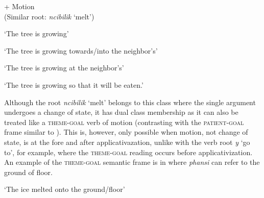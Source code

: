 \documentclass[output=paper]{langsci/langscibook}
\begin{document}
\ea\label{ex:sibanda:13}
\settowidth{}
 {+ Motion}\\
 (Similar root: \textit{ncibilik} ‘melt’)\\

\glt ‘The tree is growing’


\glt ‘The tree is growing towards/into the neighbor’s’


\glt ‘The tree is growing at the neighbor’s’ 


\glt ‘The tree is growing so that it will be eaten.’ 
\z
\z

Although the root \textit{ncibilik} ‘melt’ belongs to this class where the single argument undergoes a change of state, it has dual class membership as it can also be treated like a \textsc{theme-goal} verb of motion (contrasting with the \textsc{patient-goal} frame similar to ). This is, however, only possible when motion, not change of state, is at the fore and after applicativazation, unlike with the verb root \textit{y} ‘go to’, for example, where the \textsc{theme-goal} reading occurs before applicativization. An example of the \textsc{theme-goal} semantic frame is in  where \textit{phansi} can refer to the ground of floor. 

\glt ‘The ice melted onto the ground/floor’
\z
\end{document}
